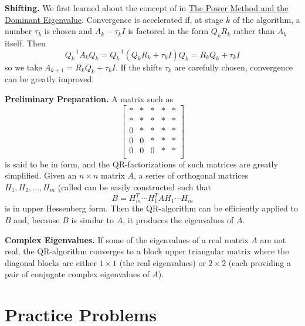 \documentclass{ximera}
\begin{document}
\textbf{Shifting.} We first learned about the concept of  in \href{}{The Power Method and the Dominant Eigenvalue}.  Convergence is accelerated if, at stage $k$ of the algorithm, a number $\tau_{k}$ is chosen and $A_{k} - \tau_{k}I$ is factored in the form $Q_{k}R_{k}$ rather than $A_{k}$ itself. Then
\begin{equation*}
Q_{k}^{-1}A_{k}Q_{k} = Q_{k}^{-1}(Q_{k}R_{k} + \tau_{k}I)Q_{k} = R_{k}Q_{k} + \tau_{k}I
\end{equation*}
so we take $A_{k+1} = R_{k}Q_{k} + \tau_{k}I$. If the shifts $\tau_{k}$ are carefully chosen, convergence can be greatly improved.

\textbf{Preliminary Preparation.} A matrix such as
\begin{equation*}
\left[ \begin{array}{rrrrr}
\ast  & \ast & \ast & \ast & \ast  \\
\ast  & \ast & \ast & \ast & \ast  \\
0  & \ast & \ast & \ast & \ast  \\
0  & 0 & \ast & \ast & \ast  \\
0  & 0 & 0 & \ast & \ast  \\
\end{array}\right]
\end{equation*}
is said to be in  form, and the QR-factorizations of such matrices are greatly simplified. Given an $n \times n$ matrix $A$, a series of orthogonal matrices $H_{1}, H_{2}, \dots, H_{m}$ (called  can be easily constructed such that
\begin{equation*}
B = H_{m}^T \cdots H_{1}^TAH_{1} \cdots H_{m}
\end{equation*}
is in upper Hessenberg form. Then the QR-algorithm can be efficiently applied to $B$ and, because $B$ is similar to $A$, it produces the eigenvalues of $A$.

\textbf{Complex Eigenvalues.} If some of the eigenvalues of a real matrix $A$ are not real, the QR-algorithm converges to a block upper triangular matrix where the diagonal blocks are either $1 \times 1$ (the real eigenvalues) or $2 \times 2$ (each providing a pair of conjugate complex eigenvalues of $A$).

\section*{Practice Problems}
\end{document}
